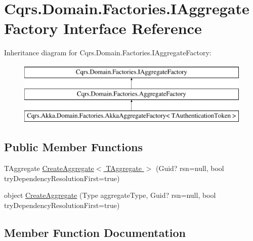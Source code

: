 \hypertarget{interfaceCqrs_1_1Domain_1_1Factories_1_1IAggregateFactory}{}\section{Cqrs.\+Domain.\+Factories.\+I\+Aggregate\+Factory Interface Reference}
\label{interfaceCqrs_1_1Domain_1_1Factories_1_1IAggregateFactory}
Inheritance diagram for Cqrs.\+Domain.\+Factories.\+I\+Aggregate\+Factory\+:\begin{figure}[H]
\begin{center}
\leavevmode
\includegraphics[height=3.000000cm]{interfaceCqrs_1_1Domain_1_1Factories_1_1IAggregateFactory}
\end{center}
\end{figure}
\subsection*{Public Member Functions}
\begin{DoxyCompactItemize}
\item 
T\+Aggregate \hyperlink{interfaceCqrs_1_1Domain_1_1Factories_1_1IAggregateFactory_aa9723aadb2dfeae42287520d76f3a397}{Create\+Aggregate$<$ T\+Aggregate $>$} (Guid? rsn=null, bool try\+Dependency\+Resolution\+First=true)
\item 
object \hyperlink{interfaceCqrs_1_1Domain_1_1Factories_1_1IAggregateFactory_a0013390ede7737375e7dbcffcadf3a12}{Create\+Aggregate} (Type aggregate\+Type, Guid? rsn=null, bool try\+Dependency\+Resolution\+First=true)
\end{DoxyCompactItemize}


\subsection{Member Function Documentation}
\mbox{\label{interfaceCqrs_1_1Domain_1_1Factories_1_1IAggregateFactory_a0013390ede7737375e7dbcffcadf3a12}} 

